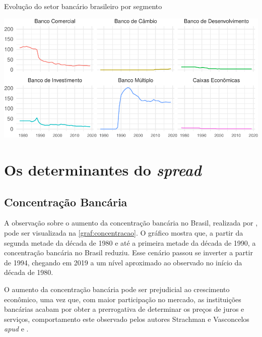 \documentclass[
  12pt,
  12pt,
  openright,
  oneside,
  a4paper,
  chapter=TITLE,
  section=TITLE,
  subsection=TITLE,
  subsubsection=TITLE,
  portugues,
  sumario=tradicional]{abntex2}
\begin{document}
\begin{grafico}[!htbp]
\vspace{20pt}
\caption{Evolução do setor bancário brasileiro por segmento}
\vspace{-4mm}

\begin{center}\includegraphics{12-exportedfigures/bank.evolution-1} \end{center}
\vspace{-3mm}
\label{graf:segmento}
\vspace{-2mm}
\end{grafico}

\section{Os determinantes do \emph{spread} }

\subsection{Concentração Bancária}

A observação sobre o aumento da concentração bancária no Brasil, realizada por \textcite{camargo:2009}, pode ser visualizada na \autoref{graf:concentracao}. O gráfico mostra que, a partir da segunda metade da década de 1980 e até a primeira metade da década de 1990, a concentração bancária no Brasil reduziu. Esse cenário passou se inverter a partir de 1994, chegando em 2019 a um nível aproximado ao observado no início da década de 1980.

O aumento da concentração bancária pode ser prejudicial ao crescimento econômico, uma vez que, com maior participação no mercado, as instituições bancárias acabam por obter a prerrogativa de determinar os preços de juros e serviços, comportamento este observado pelos autores Strachman e Vasconcelos \emph{apud} \textcite{camargo:2009} e \textcite{klein:1971}.
\end{document}

